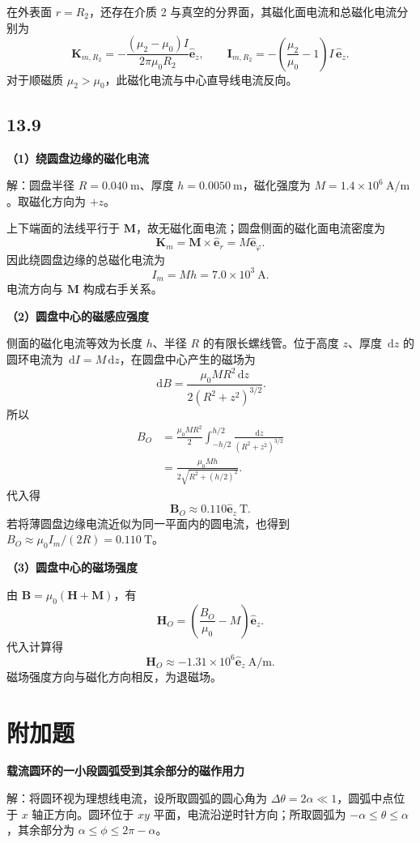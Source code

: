 \documentclass[UTF8,a4paper,12pt]{ctexart}
\newcommand{\dd}{\,\mathrm{d}}
\newcommand{\ez}{\hat{\bm e}_z}
\newcommand{\er}{\hat{\bm e}_r}
\newcommand{\ep}{\hat{\bm e}_{\varphi}}
\begin{document}
在外表面 $r=R_2$，还存在介质 2 与真空的分界面，其磁化面电流和总磁化电流分别为
\[
\bm K_{m,R_2}=-\frac{(\mu_2-\mu_0)I}{2\pi\mu_0R_2}\ez,
\qquad
\boxed{\bm I_{m,R_2}=-\left(\frac{\mu_2}{\mu_0}-1\right)I\,\ez}.
\]
对于顺磁质 $\mu_2>\mu_0$，此磁化电流与中心直导线电流反向。

\subsection*{13.9}

\textbf{（1）绕圆盘边缘的磁化电流}

解：圆盘半径 $R=0.040\ \mathrm{m}$、厚度 $h=0.0050\ \mathrm{m}$，磁化强度为 $M=1.4\times10^6\ \mathrm{A/m}$。取磁化方向为 $+z$。

上下端面的法线平行于 $\bm M$，故无磁化面电流；圆盘侧面的磁化面电流密度为
\[
\bm K_m=\bm M\times\er=M\ep.
\]
因此绕圆盘边缘的总磁化电流为
\[
\boxed{I_m=Mh=7.0\times10^3\ \mathrm{A}}.
\]
电流方向与 $\bm M$ 构成右手关系。

\textbf{（2）圆盘中心的磁感应强度}

侧面的磁化电流等效为长度 $h$、半径 $R$ 的有限长螺线管。位于高度 $z$、厚度 $\dd z$ 的圆环电流为 $\dd I=M\dd z$，在圆盘中心产生的磁场为
\[
\dd B=\frac{\mu_0MR^2\dd z}{2(R^2+z^2)^{3/2}}.
\]
所以
\[
\begin{aligned}
B_O
&=\frac{\mu_0MR^2}{2}
\int_{-h/2}^{h/2}\frac{\dd z}{(R^2+z^2)^{3/2}}\\
&=\frac{\mu_0Mh}{2\sqrt{R^2+(h/2)^2}}.
\end{aligned}
\]
代入得
\[
\boxed{\bm B_O\approx0.110\ez\ \mathrm{T}}.
\]
若将薄圆盘边缘电流近似为同一平面内的圆电流，也得到 $B_O\approx\mu_0I_m/(2R)=0.110\ \mathrm{T}$。

\textbf{（3）圆盘中心的磁场强度}

由 $\bm B=\mu_0(\bm H+\bm M)$，有
\[
\bm H_O=\left(\frac{B_O}{\mu_0}-M\right)\ez.
\]
代入计算得
\[
\boxed{\bm H_O\approx-1.31\times10^6\ez\ \mathrm{A/m}}.
\]
磁场强度方向与磁化方向相反，为退磁场。

\section*{附加题}

\textbf{载流圆环的一小段圆弧受到其余部分的磁作用力}

解：将圆环视为理想线电流，设所取圆弧的圆心角为 $\Delta\theta=2\alpha\ll1$，圆弧中点位于 $x$ 轴正方向。圆环位于 $xy$ 平面，电流沿逆时针方向；所取圆弧为 $-\alpha\leq\theta\leq\alpha$，其余部分为 $\alpha\leq\phi\leq2\pi-\alpha$。
\end{document}
